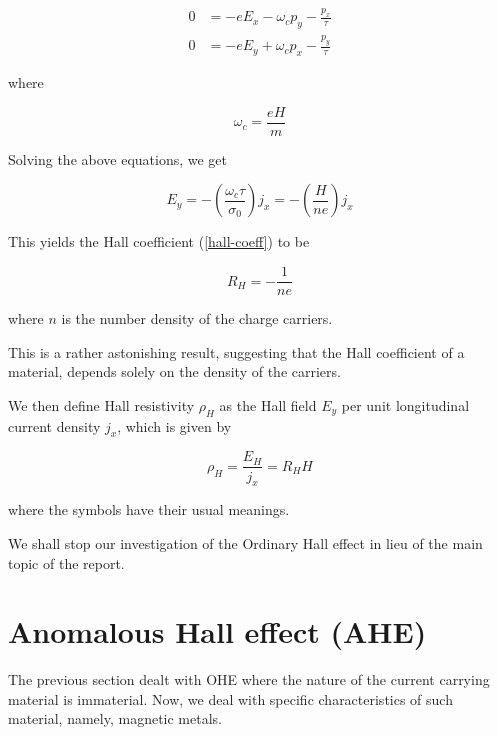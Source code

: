 \begin{equation}
    \begin{split}
        0 &= -e E_x - \omega_c p_y - \frac{p_x}{\tau}\\
        0 &= -e E_y + \omega_c p_x - \frac{p_y}{\tau} 
    \end{split}
\end{equation}

where 

\begin{equation}
    \omega_c = \frac{e H}{m} 
\end{equation}

Solving the above equations, we get

\begin{equation}
    E_y = - \left( \frac{\omega_c \tau}{\sigma_0}  \right) j_x = - \left( \frac{H}{ne} \right) j_x
\end{equation}

This yields the Hall coefficient (\cref{hall-coeff}) to be

\begin{equation}
    R_H = - \frac{1}{ne}
\end{equation}

where $ n $ is the number density of the charge carriers.

This is a rather astonishing result, suggesting that the Hall coefficient of a material, depends solely on the density of the carriers.

We then define Hall resistivity $ \rho_H $ as the Hall field $ E_y $ per unit longitudinal current density $ j_x $, which is given by

\begin{equation} \label{hall-resistivity} 
    \rho_H = \frac{E_H}{j_x} = R_H H
\end{equation}

where the symbols have their usual meanings.

We shall stop our investigation of the Ordinary Hall effect in lieu of the main topic of the report.

\section{Anomalous Hall effect (AHE)}

The previous section dealt with OHE where the nature of the current carrying material is immaterial. 
Now, we deal with specific characteristics of such material, namely, magnetic metals.

